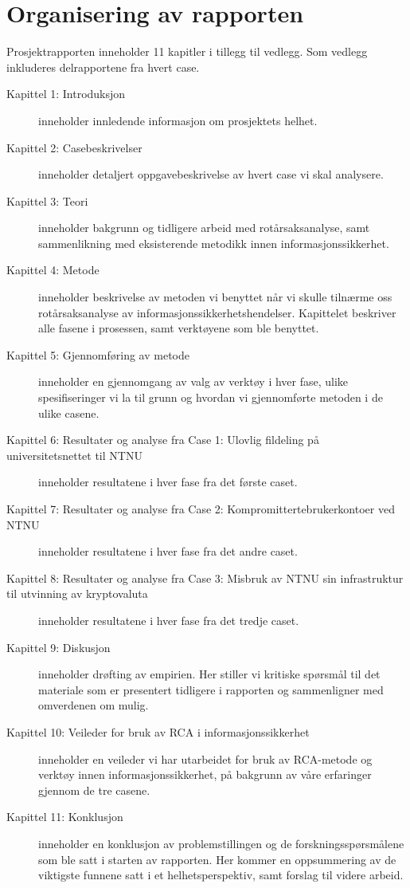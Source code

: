 \section{Organisering av rapporten}
\label{sec:organisering_rapport}
Prosjektrapporten inneholder 11 kapitler i tillegg til vedlegg. Som vedlegg inkluderes delrapportene fra hvert case. 


\begin{description}
    \item [Kapittel 1: Introduksjon] inneholder innledende informasjon om prosjektets helhet.
    
    \item [Kapittel 2: Casebeskrivelser] inneholder detaljert oppgavebeskrivelse av hvert case vi skal analysere.
    
    \item [Kapittel 3: Teori] inneholder bakgrunn og tidligere arbeid med rotårsaksanalyse, samt sammenlikning med eksisterende metodikk innen informasjonssikkerhet.
    
    \item [Kapittel 4: Metode] inneholder beskrivelse av metoden vi benyttet når vi skulle tilnærme oss rotårsaksanalyse av informasjonssikkerhetshendelser. Kapittelet beskriver alle fasene i prosessen, samt verktøyene som ble benyttet. 
    
    \item [Kapittel 5: Gjennomføring av metode] inneholder en gjennomgang av valg av verktøy i hver fase, ulike spesifiseringer vi la til grunn og hvordan vi gjennomførte metoden i de ulike casene. 
    
    \item [Kapittel 6: Resultater og analyse fra Case 1: Ulovlig fildeling på universitetsnettet til NTNU] inneholder resultatene i hver fase fra det første caset.
    
    \item [Kapittel 7: Resultater og analyse fra Case 2: Kompromittertebrukerkontoer ved NTNU] inneholder resultatene i hver fase fra det andre caset.
    
    \item [Kapittel 8: Resultater og analyse fra Case 3: Misbruk av NTNU sin infrastruktur til utvinning av kryptovaluta] inneholder resultatene i hver fase fra det tredje caset.
    
    \item [Kapittel 9: Diskusjon] inneholder drøfting av empirien. Her stiller vi kritiske spørsmål til det materiale som er presentert tidligere i rapporten og sammenligner med omverdenen om mulig. 
    
    \item [Kapittel 10: Veileder for bruk av RCA i informasjonssikkerhet] inneholder en veileder vi har utarbeidet for bruk av RCA-metode og verktøy innen informasjonssikkerhet, på bakgrunn av våre erfaringer gjennom de tre casene. 
    
    \item [Kapittel 11: Konklusjon] inneholder en konklusjon av problemstillingen og de forskningsspørsmålene som ble satt i starten av rapporten. Her kommer en oppsummering av de viktigste funnene satt i et helhetsperspektiv, samt forslag til videre arbeid. 
\end{description}